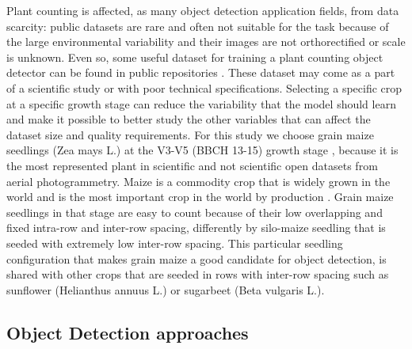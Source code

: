 \documentclass[journal,article,submit,pdftex,moreauthors]{Definitions/mdpi}
\begin{document}
Plant counting is affected, as many object detection application fields, from data scarcity: public datasets
are rare and often not suitable for the task because of the large environmental
variability and their images are not orthorectified or scale is unknown. 
Even so, some useful dataset for training a plant counting object detector can be found in public repositories \cite{heiderSurveyDatasetsComputer2025}.
These dataset may come as a part of a scientific study or with poor technical specifications. 
Selecting a specific crop at a specific growth stage can reduce the variability that 
the model should learn and make it possible to better study the other variables
that can affect the dataset size and quality requirements. 
For this study we choose grain maize seedlings
(Zea mays L.) at the V3-V5 (BBCH 13-15) growth stage \cite{meierBBCHSystemCoding2009},
because it is the most represented plant in scientific \cite{davidPlantDetectionCounting2021,liuIntegrateNetDeepLearning2022}
and not scientific \cite{Maize_seedingDatasetOverview,MaizeseedlingdetectionDatasetOverview}
open datasets from aerial photogrammetry. 
Maize is a commodity crop that is widely grown in the world and is the most important
crop in the world by production \cite{fao2024}. Grain maize seedlings in that stage are easy to
count because of their low overlapping and fixed intra-row and inter-row spacing, 
differently by silo-maize seedling that is seeded with extremely low inter-row spacing.
This particular seedling configuration that makes grain maize a good candidate for object detection,
is shared with other crops that are seeded in rows with inter-row spacing such as sunflower (Helianthus annuus L.)
or sugarbeet (Beta vulgaris L.). 

\subsection{Object Detection approaches}
\label{subsec:object_detection_approaches}
\end{document}
